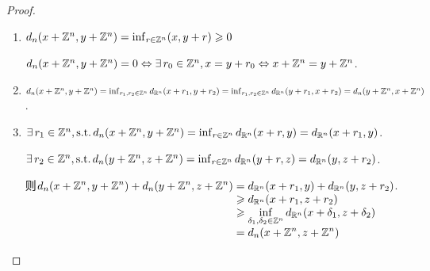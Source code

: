 \begin{proof}
    \begin{enumerate}[leftmargin=6em]
        \item[(正定性)] $d_n(x+\mathbb{Z}^n,y+\mathbb{Z}^n)=\inf_{r\in\mathbb{Z}^n}(x,y+r)\geqslant 0$\par
        $d_n(x+\mathbb{Z}^n,y+\mathbb{Z}^n)=0\Leftrightarrow \exists\, r_0\in\mathbb{Z}^n,x=y+r_0\Leftrightarrow x+\mathbb{Z}^n=y+\mathbb{Z}^n$.
        \item[(对称性)] $d_n(x+\mathbb{Z}^n,y+\mathbb{Z}^n)=\inf_{r_1,r_2\in\mathbb{Z}^n}{d_{\mathbb{R}^n}(x+r_1,y+r_2)}=\inf_{r_1,r_2\in\mathbb{Z}^n}{d_{\mathbb{R}^n}(y+r_1,x+r_2)}=d_n(y+\mathbb{Z}^n,x+\mathbb{Z}^n)$.
        \item[(三角不等式)] $\exists\, r_1\in\mathbb{Z}^n,\operatorname{\text{s.t.}} d_n(x+\mathbb{Z}^n,y+\mathbb{Z}^n)=\inf_{r\in\mathbb{Z}^n}{d_{\mathbb{R}^n}(x+r,y)}=d_{\mathbb{R}^n}(x+r_1,y)$.\par
        $\exists\, r_2\in\mathbb{Z}^n,\operatorname{\text{s.t.}} d_n(y+\mathbb{Z}^n,z+\mathbb{Z}^n)=\inf_{r\in\mathbb{Z}^n}{d_{\mathbb{R}^n}(y+r,z)}=d_{\mathbb{R}^n}(y,z+r_2)$.\par
        则$\setjot\begin{aligned}[t]
            d_n(x+\mb{Z}^n,y+\mb{Z}^n)+d_n(y+\mb{Z}^n,z+\mb{Z}^n)&= d_{\mb{R}^n}(x+r_1,y)+d_{\mb{R}^n}(y,z+r_2) \\
            &\geq d_{\mb{R}^n}(x+r_1,z+r_2) \\
            &\geq \inf_{\delta_1,\delta_2\in\mb{Z}^n}{d_{\mb{R}^n}(x+\delta_1,z+\delta_2)}\\
            &=d_n(x+\mb{Z}^n,z+\mb{Z}^n)
        \end{aligned}$.
    \end{enumerate}
\end{proof}

